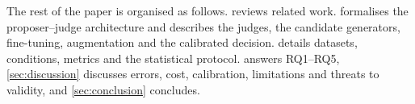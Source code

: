 The rest of the paper is organised as follows.  reviews related work.  formalises the proposer--judge architecture and describes the judges, the candidate generators, fine-tuning, augmentation and the calibrated decision.  details datasets, conditions, metrics and the statistical protocol.  answers RQ1--RQ5, \cref{sec:discussion} discusses errors, cost, calibration, limitations and threats to validity, and \cref{sec:conclusion} concludes.

